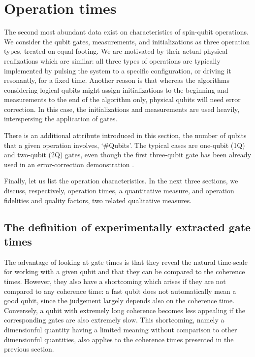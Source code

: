 \documentclass[aps, prx, showpacs, twocolumn, superscriptaddress, notitlepage, longbibliography, floatfix, nofootinbib]{revtex4-2}
\newcommand{\myKey}[1]{$\whitearrowupfrombar$\textit{#1}}
\renewcommand{\myKey}[1]{\textit{#1}}
\renewcommand{\myKey}[1]{`{#1}'}
\newcommand{\recheck}[1]{{#1}}
\begin{document}
\section{Operation times}

\label{sec:operations}

The second most abundant data exist on characteristics of spin-qubit operations. We consider the qubit gates, measurements, and initializations as three operation types, treated on equal footing.
We are motivated by their actual physical realizations which are similar: all three types of operations are typically implemented by pulsing the system to a specific configuration, or driving it resonantly, for a fixed time. Another reason is that whereas the algorithms considering logical qubits might assign initializations to the beginning and measurements to the end of the algorithm only, physical qubits will need error correction. In this case, the initializations and measurements are used heavily, interspersing the application of gates.


There is an additional attribute introduced in this section, the number of qubits that a given operation involves, \myKey{\#Qubits}. \recheck{The typical cases are one-qubit (1Q) and two-qubit (2Q) gates, even though the first three-qubit gate has been already used in an error-correction demonstration \cite{takeda_quantum_2022}. 
}

Finally, let us list the operation characteristics. In the next three sections, we discuss, respectively, operation times, a quantitative measure, and operation fidelities and quality factors, two related qualitative measures. 


\subsection{The definition of experimentally extracted gate times}

The advantage of looking at gate times is that they reveal the natural time-scale for working with a given qubit and that they can be compared to the coherence times. However, they also have a shortcoming which arises if they are not compared to any coherence time: a fast qubit does not automatically mean a good qubit, since the judgement largely depends also on the coherence time. Conversely, a qubit with extremely long coherence becomes less appealing if the corresponding gates are also extremely slow. This shortcoming, namely a dimensionful quantity having a limited meaning without comparison to other dimensionful quantities, also applies to the coherence times presented in the previous section. 
\end{document}
